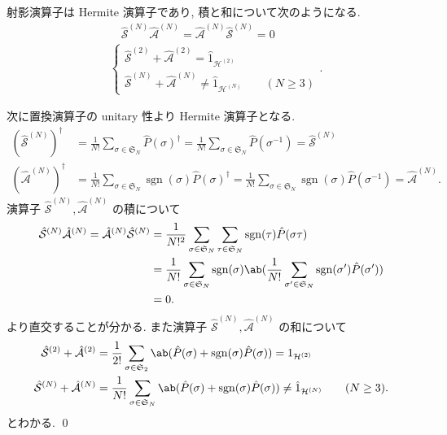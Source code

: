 \documentclass[uplatex,dvipdfmx,a4paper,11pt]{jlreq}
\makeatletter
\DeclareMathOperator{\sgn}{sgn}
\newcommand{\HH}{\mathcal{H}}
\renewcommand{\SS}{\mathfrak{S}}
\renewcommand{\S}{\mathcal{S}}
\newcommand{\A}{\mathcal{A}}
\numberwithin{equation}{section}
\theoremstyle{definition}
\renewenvironment{proof}[1][\proofname]{\par
  \normalfont
  \topsep6\p@\@plus6\p@ \trivlist
  \item[\hskip\labelsep{\bfseries #1}\@addpunct{\bfseries}]\ignorespaces\quad\par
}{%
  \qed\endtrivlist\@endpefalse
}
\renewcommand\proofname{証明}
\makeatother
\begin{document}
\begin{proposition}[Q21-14(iii)(iv)(v)]
  射影演算子は Hermite 演算子であり, 積と和について次のようになる.
  \begin{align}
     & \quad \hat{\S}^{(N)}\hat{\A}^{(N)} = \hat{\A}^{(N)}\hat{\S}^{(N)} = 0     \\
     & \begin{cases}
         \hat{\S}^{(2)} + \hat{\A}^{(2)} = \hat{1}_{\HH^{(2)}} \\
         \hat{\S}^{(N)} + \hat{\A}^{(N)} \neq \hat{1}_{\HH^{(N)}} \qquad (N \geq 3)
       \end{cases}.
  \end{align}
\end{proposition}
\begin{proof}
  次に置換演算子の unitary 性より Hermite 演算子となる.
  \begin{align}
    (\hat{\S}^{(N)})^\dagger & = \frac{1}{N!}\sum_{\sigma\in\SS_N}\hat{P}(\sigma)^\dagger = \frac{1}{N!}\sum_{\sigma\in\SS_N}\hat{P}(\sigma^{-1}) = \hat{\S}^{(N)}                          \\
    (\hat{\A}^{(N)})^\dagger & = \frac{1}{N!}\sum_{\sigma\in\SS_N}\sgn(\sigma)\hat{P}(\sigma)^\dagger = \frac{1}{N!}\sum_{\sigma\in\SS_N}\sgn(\sigma)\hat{P}(\sigma^{-1}) = \hat{\A}^{(N)}.
  \end{align}
  演算子 $\hat{\S}^{(N)}, \hat{\A}^{(N)}$ の積について
  \begin{align}
    \hat{\S}^{(N)}\hat{\A}^{(N)} = \hat{\A}^{(N)}\hat{\S}^{(N)} & = \frac{1}{N!^2}\sum_{\sigma\in\SS_N}\sum_{\tau\in\SS_N}\sgn(\tau)\hat{P}(\sigma\tau)                               \\
                                                                & = \frac{1}{N!}\sum_{\sigma\in\SS_N}\sgn(\sigma)\ab(\frac{1}{N!}\sum_{\sigma'\in\SS_N}\sgn(\sigma')\hat{P}(\sigma')) \\
                                                                & = 0.
  \end{align}
  より直交することが分かる. また演算子 $\hat{\S}^{(N)}, \hat{\A}^{(N)}$ の和について
  \begin{align}
    \hat{\S}^{(2)} + \hat{\A}^{(2)} & = \frac{1}{2!}\sum_{\sigma\in\SS_2}\ab(\hat{P}(\sigma) + \sgn(\sigma)\hat{P}(\sigma)) = 1_{\HH^{(2)}}                             \\
    \hat{\S}^{(N)} + \hat{\A}^{(N)} & = \frac{1}{N!}\sum_{\sigma\in\SS_N}\ab(\hat{P}(\sigma) + \sgn(\sigma)\hat{P}(\sigma)) \neq \hat{1}_{\HH^{(N)}} \qquad (N \geq 3).
  \end{align}
  とわかる.
\end{proof}
\end{document}
